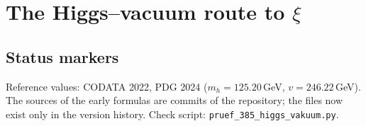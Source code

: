 
\providecommand{\BM}{\textbf{[B]}}
\providecommand{\KM}{\textbf{[K]}}
\providecommand{\SM}{\textbf{[S]}}
\providecommand{\XM}{\textbf{[X]}}
\providecommand{\QM}{\textbf{[Q]}}

\chapter*{The Higgs--vacuum route to \texorpdfstring{$\xi$}{xi}}

\begin{abstract}
The first route to the relations of FFGFT ran through the vacuum and the Higgs field. In spring
2025 it produced a formula linking the Higgs quantities to the electric constant
$\varepsilon_0$: $\lambda_h^2v^2e^2/(64\pi^4\varepsilon_0\hbar c\,m_h^2)$. This document traces the
formula through the version history from February 2025 to today, recomputes every stage and
states the current status. Written out, the vacuum formula is exactly $\xi_{\text{EFT}}\cdot\alpha$
with $\xi_{\text{EFT}}=\lambda_h^2v^2/(16\pi^3m_h^2)$; with the FFGFT convention $\alpha=1$ it
becomes today's Higgs route. With the self-coupling $\lambda_h=m_h^2/(2v^2)$ one obtains
$\xi_{\text{EFT}}=m_h^2/(64\pi^3v^2)=1.30\times10^{-4}$, about $2.3\,\%$ below $\xi=4/30000$. The
Higgs geometry is therefore a consistency check of $\xi$ to within a few per cent \KM, not an exact
derivation. Not sustainable are the early equating of the expression with~1, a short-lived variant
with $\mu_0/\varepsilon_0$, and the later shortcut to $1/(16\pi^3)$ \XM. The factor $64\pi^4$ of the
early HTML versions comes from the $4\pi$ in $4\pi\varepsilon_0$.
\end{abstract}

\section*{Status markers}

Reference values: CODATA 2022, PDG 2024 ($m_h=125.20$\,GeV, $v=246.22$\,GeV). The sources of the
early formulas are commits of the repository; the files now exist only in the version history.
Check script: \texttt{pruef\_385\_higgs\_vakuum.py}.

